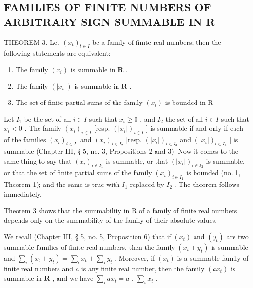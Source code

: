 \subsection{FAMILIES OF FINITE NUMBERS OF ARBITRARY SIGN SUMMABLE IN R}

THEOREM 3. Let \((x_{t})_{t\in I}\) be a family of finite real numbers; then the following statements are equivalent:

\begin{enumerate}
\def\labelenumi{\alph{enumi})}
\item
  The family \((x_{i})\) is summable in \(\mathbf{R}\) .
\item
  The family \((|x_{i}|)\) is summable in \(\mathbf{R}\) .
\item
  The set of finite partial sums of the family \((x_{t})\) is bounded in R.
\end{enumerate}

Let \(I_1\) be the set of all \(i \in I\) such that \(x_i \geq 0\) , and \(I_2\) the set of all \(i \in I\) such that \(x_i < 0\) . The family \((x_i)_{i \in I}\) {[}resp. \((|x_i|)_{i \in I}\) {]} is summable if and only if each of the families \((x_i)_{i \in I_1}\) and \((x_i)_{i \in I_2}\) {[}resp. \((|x_i|)_{i \in I_3}\) and \((|x_i|)_{i \in I_4}\) {]} is summable (Chapter III, § 5, no. 3, Propositions 2 and 3). Now it comes to the same thing to say that \((x_i)_{i \in I_1}\) is summable, or that \((|x_i|)_{i \in I_2}\) is summable, or that the set of finite partial sums of the family \((x_{i})_{i\in I_1}\) is bounded (no. 1, Theorem 1); and the same is true with \(I_1\) replaced by \(I_2\) . The theorem follows immediately.

Theorem 3 shows that the summability in R of a family of finite real numbers depends only on the summability of the family of their absolute values.

We recall (Chapter III, § 5, no. 5, Proposition 6) that if \((x_{t})\) and \((y_{t})\) are two summable families of finite real numbers, then the family \((x_{t} + y_{t})\) is summable and \(\sum_{i}(x_{t} + y_{t}) = \sum_{i}x_{t} + \sum_{i}y_{t}\) . Moreover, if \((x_{t})\) is a summable family of finite real numbers and \(a\) is any finite real number, then the family \((ax_{t})\) is summable in \(\mathbf{R}\) , and we have \(\sum_{i}ax_{t} = a\) . \(\sum_{i}x_{t}\) .

